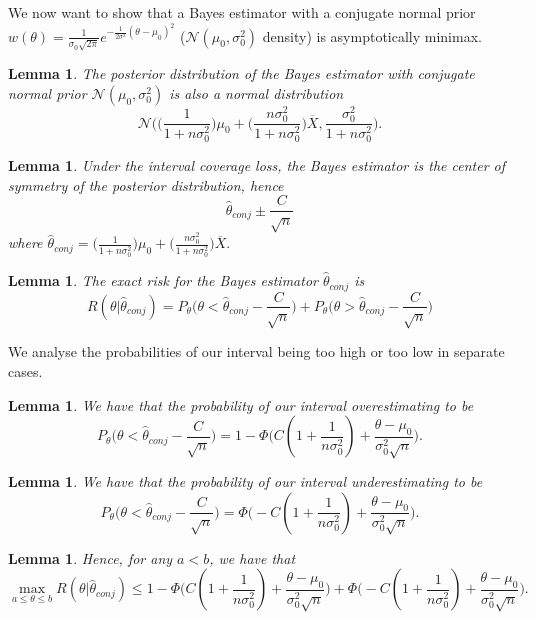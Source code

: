 \documentclass[twoside]{article}
\newtheorem{lemma}[theorem]{Lemma}
\begin{document}
We now want to show that a Bayes estimator with a conjugate normal prior $w(\theta) = \frac{1}{\sigma_0\sqrt{2\pi}}e^{-\frac{1}{2\sigma^2}(\theta - \mu_0)^2}$ ($\mathcal{N}(\mu_0, \sigma_{0}^{2})$ density) is asymptotically minimax.

\begin{lemma}The posterior distribution of the Bayes estimator with conjugate normal prior $\mathcal{N}(\mu_0, \sigma_{0}^{2})$ is also a normal distribution 
$$
\mathcal{N}\bigg( \big(\frac{1}{1+n\sigma_{0}^{2}}\big)\mu_0 + \big(\frac{n\sigma_{0}^{2}}{1 + n\sigma_{0}^{2}}\big)\overline{X}, \frac{\sigma_{0}^{2}}{1 + n\sigma_{0}^{2}}  \bigg).
$$
\end{lemma}

\begin{lemma}Under the interval coverage loss, the Bayes estimator is the center of symmetry of the posterior distribution, hence 
$$
\hat{\theta}_{conj} \pm \frac{C}{\sqrt{n}}
$$
where $\hat{\theta}_{conj} = \big(\frac{1}{1+n\sigma_{0}^{2}}\big)\mu_0 + \big(\frac{n\sigma_{0}^{2}}{1 + n\sigma_{0}^{2}}\big)\overline{X}.$
\end{lemma}

\begin{lemma}The exact risk for the Bayes estimator $\hat{\theta}_{conj}$ is
$$
R(\theta|\hat{\theta}_{conj}) = P_{\theta}\bigg(\theta < \hat{\theta}_{conj} - \frac{C}{\sqrt{n}} \bigg) + P_{\theta}\bigg(\theta > \hat{\theta}_{conj} - \frac{C}{\sqrt{n}} \bigg)
$$
\end{lemma}

We analyse the probabilities of our interval being too high or too low in separate cases.
\begin{lemma}We have that the probability of our interval overestimating to be 
$$
P_{\theta}\bigg(\theta < \hat{\theta}_{conj} - \frac{C}{\sqrt{n}} \bigg) = 1 - \Phi\bigg(C(1 + \frac{1}{n\sigma_0^2}) + \frac{\theta - \mu_0}{\sigma_0^2\sqrt{n}} \bigg).
$$
\end{lemma}

\begin{lemma}We have that the probability of our interval underestimating to be 
$$
P_{\theta}\bigg(\theta < \hat{\theta}_{conj} - \frac{C}{\sqrt{n}} \bigg) = \Phi\bigg(-C(1 + \frac{1}{n\sigma_0^2}) + \frac{\theta - \mu_0}{\sigma_0^2\sqrt{n}} \bigg).
$$
\end{lemma}

\begin{lemma}Hence, for any $a < b$, we have that 
$$
\max_{a \leq \theta \leq b}R(\theta|\hat{\theta}_{conj}) \leq 1 - \Phi\bigg(C(1 + \frac{1}{n\sigma_0^2}) + \frac{\theta - \mu_0}{\sigma_0^2\sqrt{n}} \bigg) + \Phi\bigg(-C(1 + \frac{1}{n\sigma_0^2}) + \frac{\theta - \mu_0}{\sigma_0^2\sqrt{n}} \bigg).
$$
\end{lemma}
\end{document}
